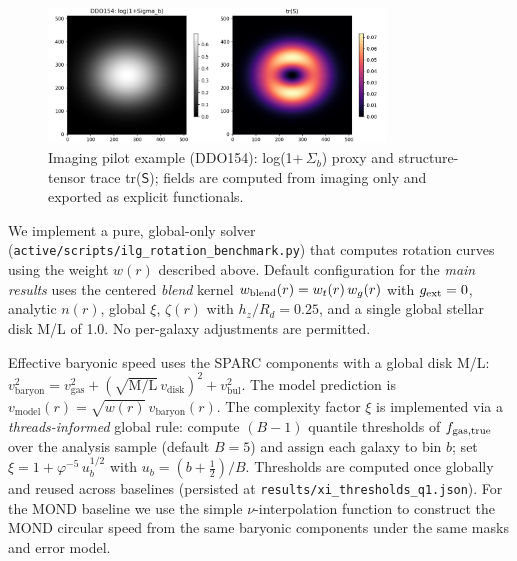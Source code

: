 \documentclass[fleqn,usenatbib]{mnras}
\begin{document}
\begin{figure}[h]
\centering
\includegraphics[width=0.80\textwidth]{results/imaging_pilot/DDO154/quicklook.png}
\caption{Imaging pilot example (DDO154): log(1+\,$\Sigma_b$) proxy and structure-tensor trace tr($\mathsf S$); fields are computed from imaging only and exported as explicit functionals.}
\label{fig:imaging_pilot_example}
\end{figure}

We implement a pure, global-only solver (\texttt{active/scripts/ilg\_rotation\_benchmark.py}) that computes rotation curves using the weight $w(r)$ described above. Default configuration for the \emph{main results} uses the centered \emph{blend} kernel $w_{\rm blend}(r)=w_t(r)\,w_g(r)$ with $g_{\rm ext}=0$, analytic $n(r)$, global $\xi$, $\zeta(r)$ with $h_z/R_d=0.25$, and a single global stellar disk M/L of 1.0. No per-galaxy adjustments are permitted.

Effective baryonic speed uses the SPARC components with a global disk M/L: $v_\mathrm{baryon}^2 = v_\mathrm{gas}^2 + (\sqrt{\mathrm{M/L}}\,v_\mathrm{disk})^2 + v_\mathrm{bul}^2$. The model prediction is $v_\mathrm{model}(r) = \sqrt{w(r)}\, v_\mathrm{baryon}(r)$. The complexity factor $\xi$ is implemented via a \emph{threads-informed} global rule: compute $(B{-}1)$ quantile thresholds of $f_{\rm gas,true}$ over the analysis sample (default $B{=}5$) and assign each galaxy to bin $b$; set $\xi=1+\varphi^{-5}\,u_b^{1/2}$ with $u_b=(b+\tfrac{1}{2})/B$. Thresholds are computed once globally and reused across baselines (persisted at \texttt{results/xi\_thresholds\_q1.json}).
For the MOND baseline we use the simple $\nu$-interpolation function to construct the MOND circular speed from the same baryonic components under the same masks and error model.
\end{document}
